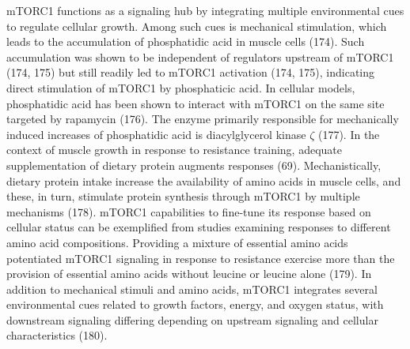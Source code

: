 \documentclass[twoside,10pt]{gihclass} %
\begin{document}
mTORC1 functions as a signaling hub by integrating multiple environmental cues to regulate cellular growth. Among such cues is mechanical stimulation, which leads to the accumulation of phosphatidic acid in muscle cells
(174).
Such accumulation was shown to be independent of regulators upstream of mTORC1
(174, 175)
but still readily led to mTORC1 activation
(174, 175), indicating direct stimulation of mTORC1 by phosphaticic acid.
In cellular models, phosphatidic acid has been shown to interact with mTORC1 on the same site targeted by rapamycin
(176).
The enzyme primarily responsible for mechanically induced increases of phosphatidic acid is diacylglycerol kinase \(\zeta\)
(177).
In the context of muscle growth in response to resistance training, adequate supplementation of dietary protein augments responses
(69).
Mechanistically, dietary protein intake increase the availability of amino acids in muscle cells, and these, in turn, stimulate protein synthesis through mTORC1 by multiple mechanisms
(178).
mTORC1 capabilities to fine-tune its response based on cellular status can be exemplified from studies examining responses to different amino acid compositions.
Providing a mixture of essential amino acids potentiated mTORC1 signaling in response to resistance exercise more than the provision of essential amino acids without leucine or leucine alone
(179).
In addition to mechanical stimuli and amino acids, mTORC1 integrates several environmental cues related to growth factors, energy, and oxygen status, with downstream signaling differing depending on upstream signaling and cellular characteristics
(180).
\end{document}
